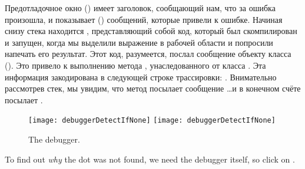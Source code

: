 \documentclass[a4paper,10pt,twoside]{book}
\begin{document}
Предотладочное окно () имеет заголовок, сообщающий нам, что за ошибка произошла, и показывает  () сообщений, которые привели к ошибке.
Начиная снизу стека находится , представляющий собой код, который был скомпилирован и запущен, когда мы выделили выражение  в рабочей области и попросили \pharo напечать его результат.
Этот код, разумеется, послал сообщение  объекту класса  ().
Это привело к выполнению метода , унаследованного от класса . Эта информация закодирована в следующей строке трассировки: .  
Внимательно рассмотрев стек, мы увидим, что метод  посылает сообщение \ldots и в конечном счёте  посылает .

\begin{figure}[btp]
	\begin{center}
	\ifluluelse
		{\texttt{[image: debuggerDetectIfNone]}}
		{\texttt{[image: debuggerDetectIfNone]}}
	\end{center}
	\caption{The debugger.}
\end{figure}

To find out \emph{why} the dot was not found, we need the debugger itself, so click on .

\end{document}

